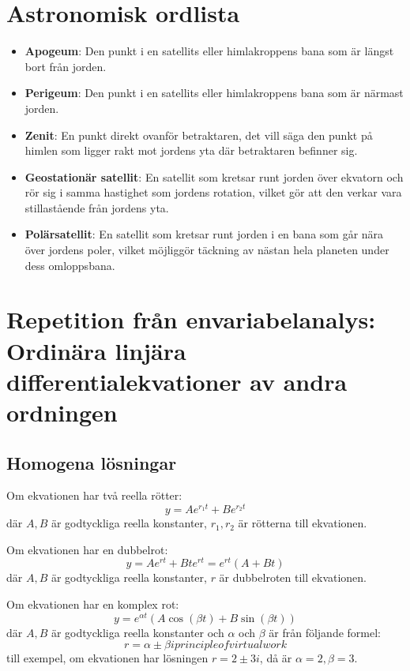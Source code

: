 \documentclass{article}
\newenvironment{ankiflashcard}[1]{}{}
\begin{document}
\newpage
\begin{appendix}
\appendixpage
\section{Astronomisk ordlista}
\begin{itemize}
    \item \textbf{Apogeum}: Den punkt i en satellits eller himlakroppens bana som är längst bort från jorden.
    \item \textbf{Perigeum}: Den punkt i en satellits eller himlakroppens bana som är närmast jorden.
    \item \textbf{Zenit}: En punkt direkt ovanför betraktaren, det vill säga den punkt på himlen som ligger rakt mot jordens yta där betraktaren befinner sig.
    \item \textbf{Geostationär satellit}: En satellit som kretsar runt jorden över ekvatorn och rör sig i samma hastighet som jordens rotation, vilket gör att den verkar vara stillastående från jordens yta.
    \item \textbf{Polärsatellit}: En satellit som kretsar runt jorden i en bana som går nära över jordens poler, vilket möjliggör täckning av nästan hela planeten under dess omloppsbana.
\end{itemize}

\begin{ankiflashcard}{Repetera envariabeln: ange lösningarna till en typisk andra ordningens linjär homogen differentialekvation med konstanta koefficienter.}
\section*{Repetition från envariabelanalys: Ordinära linjära differentialekvationer av andra ordningen}

\subsection*{Homogena lösningar}

Om ekvationen har två reella rötter:
$$
y = Ae^{r_1t} + Be^{r_2t}
$$
där $ A, B $ är godtyckliga reella konstanter, $ r_1, r_2 $ är rötterna till ekvationen.

Om ekvationen har en dubbelrot:
$$
y = Ae^{rt} + Bte^{rt} = e^{rt}(A + Bt)
$$
där $ A, B $ är godtyckliga reella konstanter, $ r $ är dubbelroten till ekvationen.

Om ekvationen har en komplex rot:
$$
y = e^{\alpha t}(A\cos(\beta t) + B\sin(\beta t))
$$
där $ A, B $ är godtyckliga reella konstanter och $ \alpha $ och $ \beta $ är från följande formel:
$$
r = \alpha \pm \beta iprinciple of virtual work
$$
till exempel, om ekvationen har lösningen $ r = 2 \pm 3i $, då är $ \alpha = 2, \beta = 3 $.


\end{ankiflashcard}
\end{appendix}
\end{document}
